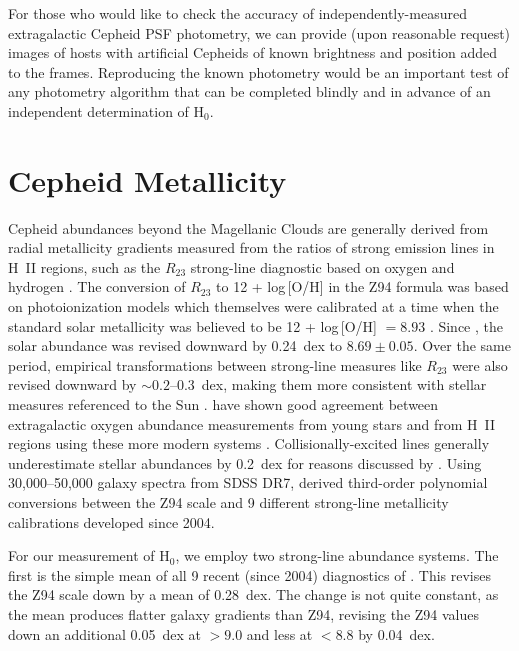 \documentclass[12pt]{aastex631}
\begin{document}
\begin{appendices}
For those who would like to check the accuracy of independently-measured extragalactic Cepheid PSF photometry, we can provide (upon reasonable request) images of hosts with artificial Cepheids of known brightness and position added to the frames. Reproducing the known photometry would be an important test of any photometry algorithm that can be completed blindly and in advance of an independent determination of H$_0$.
      
\section{Cepheid Metallicity\label{sc:appc}}

Cepheid abundances beyond the Magellanic Clouds are generally derived from radial metallicity gradients measured from the ratios of strong emission lines in H~II regions, such as the $R_{23}$ strong-line diagnostic based on oxygen and hydrogen \citep[][hereafter Z94]{zaritsky94}.  The conversion of $R_{23}$ to 12 + log\,[O/H] in the Z94 formula was based on photoionization models which themselves were calibrated at a time when the standard solar metallicity was believed to be 12 + log\,[O/H] $=8.93$ \cite{Anders:1989}. Since \citet{Asplund:2005,asplund09}, the solar abundance was revised downward by 0.24~dex to $8.69\pm0.05$. Over the same period, empirical transformations between strong-line measures like $R_{23}$ were also revised downward by $\sim 0.2$--0.3~dex, making them more consistent with stellar measures referenced to the Sun \citep{Pettini:2004,Kewley:2008,Tremonti:2004,Dopita:2016,Curti:2017}. \citet{Bresolin:2016} have shown good agreement between extragalactic oxygen abundance measurements from young stars and from H~II regions using these more modern systems \citep[particularly for][hereafter, PP04 O3N2; Bresolin, priv. comm.]{Pettini:2004}. Collisionally-excited lines generally underestimate stellar abundances by 0.2~dex for reasons discussed by \citet{Carigi:2019}. Using 30,000--50,000 galaxy spectra from SDSS DR7, \citet{Teimoorinia:2021} derived third-order polynomial conversions between the Z94 scale and 9 different strong-line metallicity calibrations developed since 2004.  

For our measurement of H$_0$, we employ two strong-line abundance systems.  The first is the simple mean of all 9 recent (since 2004) diagnostics of \citet{Teimoorinia:2021}. This revises the Z94 scale down by a mean of 0.28~dex.  The change is not quite constant, as the mean produces flatter galaxy gradients than Z94, revising the Z94 values down an additional 0.05~dex at $>9.0$ and less at $<8.8$ by 0.04~dex. 


\end{appendices}
\end{document}
